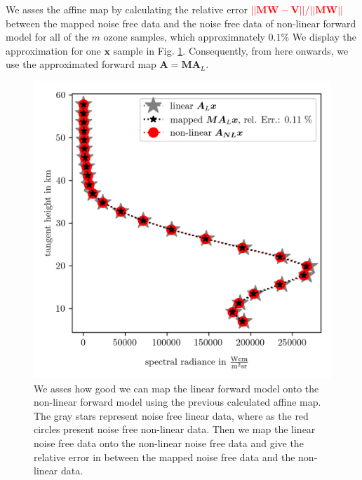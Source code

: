 We asses the affine map by calculating the relative error\textcolor{red}{ $|| \bm{M}\bm{W} - \bm{V}  || / || \bm{M}\bm{W} ||$ } between the mapped noise free data and the noise free data of non-linear forward model for all of the $m$ ozone samples, which approximnately $0.1$\%
We display the approximation for one $\bm{x}$ sample in Fig. \ref{fig:MapAsses}.
Consequently, from here onwards, we use the approximated forward map $\bm{A} = \bm{M A}_L $.
\begin{figure}[ht!]
	\centering
	\includegraphics{SampMapAssesmentTT.png}
	\caption[Assessment of affine map.]{We asses how good we can map the linear forward model onto the non-linear forward model using the previous calculated affine map. The gray stars represent noise free linear data, where as the red circles present noise free non-linear data. Then we map the linear noise free data onto the non-linear noise free data and give the relative error in between the mapped noise free data and the non-linear data.}
	\label{fig:MapAsses}
\end{figure}


